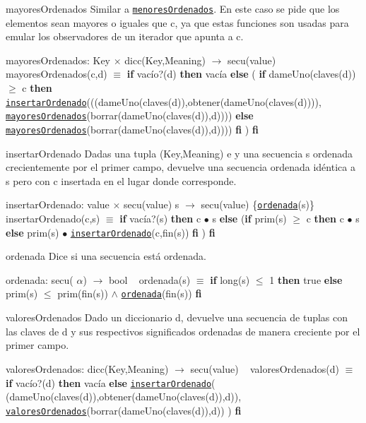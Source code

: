 \begin{DoxyParagraph}{mayores\+Ordenados}
Similar a \href{axiomas.html#menoresOrdenados}{\tt menores\+Ordenados}. En este caso se pide que los elementos sean mayores o iguales que c, ya que estas funciones son usadas para emular los observadores de un iterador que apunta a c.

mayores\+Ordenados\+: Key $\times$ dicc(\+Key,\+Meaning) $\to$ secu(value) ~\newline
mayores\+Ordenados(c,d) $\equiv$ {\bfseries if} vacío?(d) {\bfseries then} vacía {\bfseries else} ( {\bfseries if} dame\+Uno(claves(d)) $\geq$ c {\bfseries then} \href{axiomas.html#insertarOrdenado}{\tt insertar\+Ordenado}(((dame\+Uno(claves(d)),obtener(dame\+Uno(claves(d)))), \href{axiomas.html#mayoresOrdenados}{\tt mayores\+Ordenados}(borrar(dame\+Uno(claves(d)),d)))) {\bfseries else} \href{axiomas.html#mayoresOrdenados}{\tt mayores\+Ordenados}(borrar(dame\+Uno(claves(d)),d)))) {\bfseries fi} ) {\bfseries fi} 


\end{DoxyParagraph}
\begin{DoxyParagraph}{insertar\+Ordenado}
Dadas una tupla (Key,Meaning) e y una secuencia s ordenada crecientemente por el primer campo, devuelve una secuencia ordenada idéntica a s pero con c insertada en el lugar donde corresponde.

insertar\+Ordenado\+: value $\times$ secu(value) s $\to$ secu(value) \{\href{axiomas.html#ordenada}{\tt ordenada}(s)\} ~\newline
insertar\+Ordenado(c,s) $\equiv$ {\bfseries if} vacía?(s) {\bfseries then} c $\bullet$ s {\bfseries else} ({\bfseries if} prim(s) $\geq$ c {\bfseries then} c $\bullet$ s {\bfseries else} prim(s) $\bullet$ \href{axiomas.html#insertarOrdenado}{\tt insertar\+Ordenado}(c,fin(s)) {\bfseries fi} ) {\bfseries fi} 


\end{DoxyParagraph}
\begin{DoxyParagraph}{ordenada}
Dice si una secuencia está ordenada.

ordenada\+: secu( $\alpha$) $\to$ bool ~\newline
ordenada(s) $\equiv$ {\bfseries if} long(s) $\leq$ 1 {\bfseries then} true {\bfseries else} prim(s) $\leq$ prim(fin(s)) $\land$ \href{axiomas.html#ordenada}{\tt ordenada}(fin(s)) {\bfseries fi} 


\end{DoxyParagraph}
\begin{DoxyParagraph}{valores\+Ordenados}
Dado un diccionario d, devuelve una secuencia de tuplas con las claves de d y sus respectivos significados ordenadas de manera creciente por el primer campo.

valores\+Ordenados\+: dicc(\+Key,\+Meaning) $\to$ secu(value) ~\newline
valores\+Ordenados(d) $\equiv$ {\bfseries if} vacío?(d) {\bfseries then} vacía {\bfseries else} \href{axiomas.html#insertarOrdenado}{\tt insertar\+Ordenado}( (dame\+Uno(claves(d)),obtener(dame\+Uno(claves(d)),d)), \href{axiomas.html#valoresOrdenados}{\tt valores\+Ordenados}(borrar(dame\+Uno(claves(d)),d)) ) {\bfseries fi} 


\end{DoxyParagraph}
